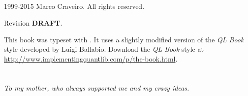 \documentclass{book}
\begin{document}



%
%
\newpage
{}
\section*{}
\pagestyle{empty}
\vfill
\begingroup
\footnotesize
\parindent 0pt
\parskip \baselineskip

\textcopyright{} 1999-2015 Marco Craveiro. All rights reserved.

Revision \textbf{DRAFT}.

This book was typeset with \LaTeXe. It uses a slightly modified
version of the \textit{QL Book} style developed by Luigi Ballabio.
Download the \textit{QL Book} style at
\url{http://www.implementingquantlib.com/p/the-book.html}.

\endgroup

\pagestyle{empty}
\clearpage
\chapter*{}
\begin{flushright}
\emph{To my mother, who always supported me and my crazy ideas.}

\bigskip

\end{flushright}

\clearpage

\pagestyle{headings}
\setcounter{tocdepth}{3}
\tableofcontents
\end{document}
